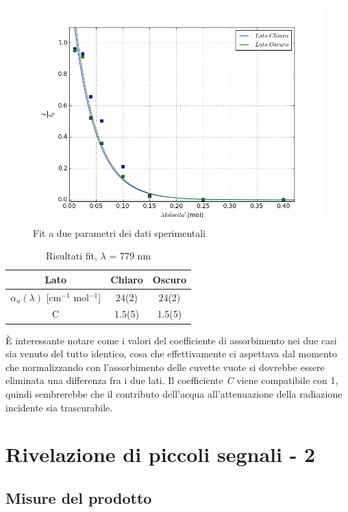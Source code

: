 \documentclass[a4paper]{article}
\begin{document}
\begin{figure}[!h]
\centering
\includegraphics[scale=.6]{primofit}
\caption{Fit a due parametri dei dati sperimentali}
\label{fit:2}
\end{figure}

\begin{table}[!h]
\centering
\caption{Risultati fit, $\lambda$ = 779 nm}
\label{tab:fit}
\begin{tabular}{c|c|c}
\textbf{Lato} & \textbf{Chiaro} & \textbf{Oscuro} \\
\hline
$\alpha _u (\lambda)$ [cm$^{-1}$ mol$^{-1}$]& 24(2) & 24(2) \\ 
\hline 
C & 1.5(5) & 1.5(5) \\ 
\end{tabular} 
\end{table}

È interessante notare come i valori del coefficiente di assorbimento nei due casi sia venuto del tutto identico, cosa che effettivamente ci aspettava dal momento che normalizzando con l'assorbimento delle cuvette vuote si dovrebbe essere eliminata una differenza fra i due lati. Il coefficiente \emph{C} viene compatibile con 1, quindi sembrerebbe che il contributo dell'acqua all'attenuazione della radiazione incidente sia trascurabile.

\section{Rivelazione di piccoli segnali - 2}
\subsection{Misure del prodotto}
\end{document}
